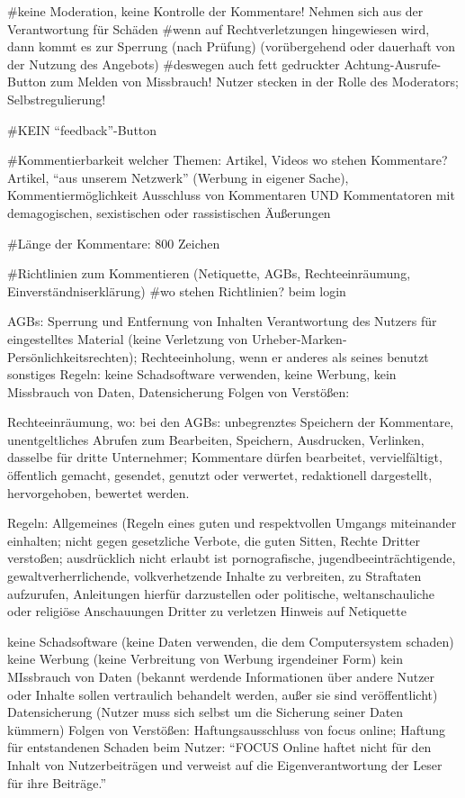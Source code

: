 
#keine Moderation, keine Kontrolle der Kommentare! Nehmen sich aus der Verantwortung für Schäden
#wenn auf Rechtverletzungen hingewiesen wird, dann kommt es zur Sperrung (nach Prüfung) (vorübergehend oder dauerhaft von der Nutzung des Angebots)
#deswegen auch fett gedruckter Achtung-Ausrufe-Button zum Melden von Missbrauch! Nutzer stecken in der Rolle des Moderators; Selbstregulierung!



#KEIN ``feedback''-Button



#Kommentierbarkeit welcher Themen: Artikel, Videos
wo stehen Kommentare? Artikel, ``aus unserem Netzwerk'' (Werbung in eigener Sache), Kommentiermöglichkeit
Ausschluss von Kommentaren UND Kommentatoren mit demagogischen, sexistischen oder rassistischen Äußerungen



#Länge der Kommentare: 800 Zeichen

#Richtlinien zum Kommentieren (Netiquette, AGBs, Rechteeinräumung, Einverständniserklärung)
#wo stehen Richtlinien? beim login


AGBs: Sperrung und Entfernung von Inhalten 
			Verantwortung des Nutzers für eingestelltes Material (keine Verletzung von Urheber-Marken-Persönlichkeitsrechten); Rechteeinholung, wenn er anderes als seines 					benutzt
			sonstiges Regeln: keine Schadsoftware verwenden, keine Werbung, kein Missbrauch von Daten, Datensicherung 
			Folgen von Verstößen: 
			
			
			
	Rechteeinräumung, wo: bei den AGBs: unbegrenztes Speichern der Kommentare, unentgeltliches Abrufen zum Bearbeiten, Speichern, Ausdrucken, Verlinken, 										dasselbe für dritte Unternehmer; Kommentare dürfen bearbeitet, vervielfältigt, öffentlich gemacht, gesendet, genutzt oder 										verwertet, redaktionell dargestellt, hervorgehoben, bewertet werden.

Regeln: 
	Allgemeines (Regeln eines guten und respektvollen Umgangs miteinander einhalten; nicht gegen gesetzliche Verbote, die guten Sitten, Rechte Dritter verstoßen; 				ausdrücklich nicht erlaubt ist pornografische, jugendbeeinträchtigende, gewaltverherrlichende, volkverhetzende Inhalte zu verbreiten, zu Straftaten aufzurufen, 				Anleitungen hierfür darzustellen oder politische, weltanschauliche oder religiöse Anschauungen Dritter zu verletzen
	Hinweis auf Netiquette
	
	keine Schadsoftware (keine Daten verwenden, die dem Computersystem schaden)
	keine Werbung (keine Verbreitung von Werbung irgendeiner Form)
	kein MIssbrauch von Daten (bekannt werdende Informationen über andere Nutzer oder Inhalte sollen vertraulich behandelt werden, außer sie sind veröffentlicht)
	Datensicherung (Nutzer muss sich selbst um die Sicherung seiner Daten kümmern)
	Folgen von Verstößen: Haftungsausschluss von focus online; Haftung für entstandenen Schaden beim Nutzer: ``FOCUS Online haftet nicht für den Inhalt von Nutzerbeiträgen und verweist auf die Eigenverantwortung der Leser für ihre Beiträge.''

